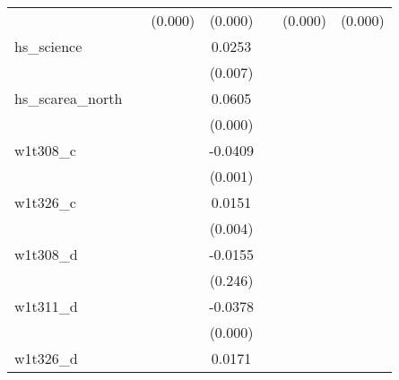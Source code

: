{\begin{tabular}{l*{6}{c}}
            &                     &     (0.000)         &     (0.000)         &                     &     (0.000)         &     (0.000)         \\
[1em]
hs\_science  &                     &                     &      0.0253\sym{***}&                     &                     &                     \\
            &                     &                     &     (0.007)         &                     &                     &                     \\
[1em]
hs\_scarea\_north&                     &                     &      0.0605\sym{***}&                     &                     &                     \\
            &                     &                     &     (0.000)         &                     &                     &                     \\
[1em]
w1t308\_c    &                     &                     &     -0.0409\sym{***}&                     &                     &                     \\
            &                     &                     &     (0.001)         &                     &                     &                     \\
[1em]
w1t326\_c    &                     &                     &      0.0151\sym{***}&                     &                     &                     \\
            &                     &                     &     (0.004)         &                     &                     &                     \\
[1em]
w1t308\_d    &                     &                     &     -0.0155         &                     &                     &                     \\
            &                     &                     &     (0.246)         &                     &                     &                     \\
[1em]
w1t311\_d    &                     &                     &     -0.0378\sym{***}&                     &                     &                     \\
            &                     &                     &     (0.000)         &                     &                     &                     \\
[1em]
w1t326\_d    &                     &                     &      0.0171\sym{***}&                     &                     &                     \\

\end{tabular}}
